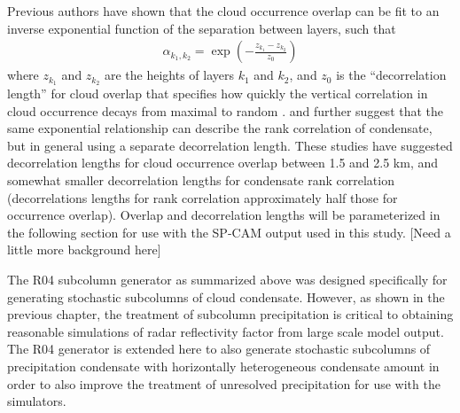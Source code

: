 Previous authors have shown that the cloud occurrence overlap can be fit to an inverse exponential function of the separation between layers, such that
\begin{gather}
    \alpha_{k_1, k_2} = \exp\left(-\frac{z_{k_1} - z_{k_2}}{z_0}\right)
    \label{alpha_exponential_equation}
\end{gather}
where $z_{k_1}$ and $z_{k_2}$ are the heights of layers $k_1$ and $k_2$, and $z_0$ is the ``decorrelation length'' for cloud overlap that specifies how quickly
the vertical correlation in cloud occurrence decays from maximal to random
\citep{hogan_and_illingworth_2000, mace_and_benson-troth_2002,
raisanen_et_al_2004, pincus_et_al_2005, barker_2008, tompkins_and_digiuseppe_2015}. \cite{raisanen_et_al_2004} and \cite{pincus_et_al_2005} further
suggest that the same exponential relationship can describe the rank
correlation of condensate, but in general using a separate decorrelation length.
These studies have suggested decorrelation lengths for cloud occurrence overlap between 1.5 and 2.5 km, and somewhat smaller decorrelation lengths for condensate rank correlation (decorrelations lengths for rank correlation approximately half those for occurrence overlap). Overlap and decorrelation lengths will be parameterized in the following section for use with the SP-CAM output used in this study. [Need a little more background here]

The R04 subcolumn generator as summarized above was designed specifically for generating stochastic subcolumns of cloud condensate. However, as shown in the previous chapter, the treatment of subcolumn precipitation is critical to obtaining reasonable simulations of radar reflectivity factor from large scale model output. The R04 generator is extended here to also generate stochastic subcolumns of precipitation condensate with horizontally heterogeneous condensate amount in order to also improve the treatment of unresolved precipitation for use with the simulators. 

